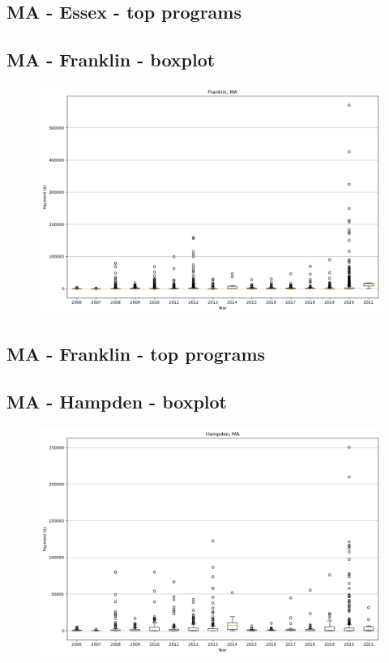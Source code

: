 \subsection*{MA - Essex - top programs}

\newpage
\subsection*{MA - Franklin - boxplot}
\begin{figure}[h]
\centering
\includegraphics[width=7in]{../output/boxplots/counties/Franklin-MA_boxplot.png}
\end{figure}


\subsection*{MA - Franklin - top programs}

\newpage
\subsection*{MA - Hampden - boxplot}
\begin{figure}[h]
\centering
\includegraphics[width=7in]{../output/boxplots/counties/Hampden-MA_boxplot.png}
\end{figure}


